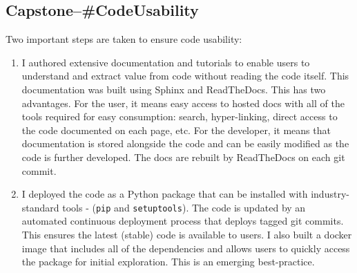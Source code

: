 \documentclass[../main.tex]{subfiles}
\begin{document}

\subsection*{\textbf{Capstone--\#CodeUsability}}
\label{lo:CodeUsability}

Two important steps are taken to ensure code usability:

\begin{enumerate}
    \item I authored extensive documentation and tutorials to enable users to understand and extract value from code without reading the code itself. This documentation was built using Sphinx and ReadTheDocs. This has two advantages. For the user, it means easy access to hosted docs with all of the tools required for easy consumption: search, hyper-linking, direct access to the code documented on each page, etc. For the developer, it means that documentation is stored alongside the code and can be easily modified as the code is further developed. The docs are rebuilt by ReadTheDocs on each git commit.
    
    \item I deployed the code as a Python package that can be installed with industry-standard tools - (\texttt{pip} and \texttt{setuptools}). The code is updated by an automated continuous deployment process that deploys tagged git commits. This ensures the latest (stable) code is available to users. I also built a docker image that includes all of the dependencies and allows users to quickly access the package for initial exploration. This is an emerging best-practice.
    
\end{enumerate}

\end{document}
